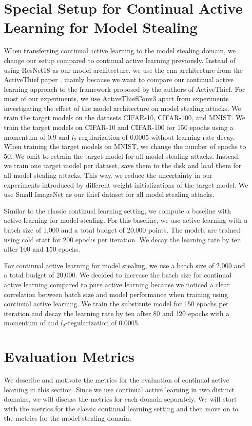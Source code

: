 \section{Special Setup for Continual Active Learning for Model Stealing}
\label{sec:Methodology:CALMSsetup}
When transferring continual active learning to the model stealing domain, we change our setup compared to continual active learning previously. Instead of using ResNet18 as our
model architecture, we use the \gls{cnn} architecture from the ActiveThief paper \cite{pal2020activethief}, mainly because we want to compare our continual active learning approach to
the framework proposed by the authors of ActiveThief. For most of our experiments, we use ActiveThiefConv3 apart from experiments investigating the effect of the model 
architecture on model stealing attacks. We train the target models on the datasets CIFAR-10, CIFAR-100, and MNIST. We train the target models on CIFAR-10 and CIFAR-100 for
150 epochs using a momentum of 0.9 and $l_2$-regularization of 0.0005 without learning rate decay. When training the target models on MNIST, we change the number of epochs to 50.
We omit to retrain the target model for all model stealing attacks. Instead, we train one target model per dataset, save them to the disk and load them for all model stealing
attacks. This way, we reduce the uncertainty in our experiments introduced by different weight initializations of the target model. We use Small ImageNet as our thief dataset for all model stealing attacks. \par
Similar to the classic continual learning setting, we compute a baseline with active learning for model stealing. For this baseline, we use active learning with a batch size of 1,000
and a total budget of 20,000 points. The models are trained using cold start for 200 epochs per iteration. We decay the learning rate by ten after 100 and 150 epochs. \par
For continual active learning for model stealing, we use a batch size of 2,000 and a total budget of 20,000. We decided to increase the batch size for continual active learning compared
to pure active learning because we noticed a clear correlation between batch size and model performance when training using continual active learning. We train the substitute model for
150 epochs per iteration and decay the learning rate by ten after 80 and 120 epochs with a momentum of and $l_2$-regularization of 0.0005.

\section{Evaluation Metrics}
\label{sec:Methodology:Metrics}
We describe and motivate the metrics for the evaluation of continual active learning in this section. Since we use continual active learning in two distinct
domains, we will discuss the metrics for each domain separately. We will start with the metrics for the classic continual learning setting and then move on to the
metrics for the model stealing domain.

